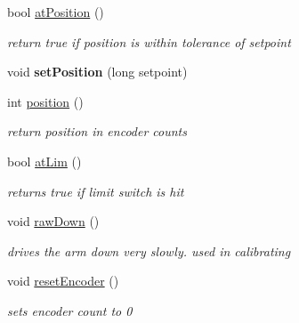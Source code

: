 \begin{DoxyCompactItemize}
\item 
\hypertarget{classArm_ae3c0195535b15f56f9027aea0ae5ec76}{bool \hyperlink{classArm_ae3c0195535b15f56f9027aea0ae5ec76}{at\-Position} ()}\label{classArm_ae3c0195535b15f56f9027aea0ae5ec76}

\begin{DoxyCompactList}\small\item\em return true if position is within tolerance of setpoint \end{DoxyCompactList}\item 
\hypertarget{classArm_a11049528120ab063b71e5614d0c6b12c}{void {\bfseries set\-Position} (long setpoint)}\label{classArm_a11049528120ab063b71e5614d0c6b12c}

\item 
\hypertarget{classArm_ab49756ee4bfdc5f573a78f29678bf1d8}{int \hyperlink{classArm_ab49756ee4bfdc5f573a78f29678bf1d8}{position} ()}\label{classArm_ab49756ee4bfdc5f573a78f29678bf1d8}

\begin{DoxyCompactList}\small\item\em return position in encoder counts \end{DoxyCompactList}\item 
\hypertarget{classArm_a234397ff44a8ac5fda920d92b9b33237}{bool \hyperlink{classArm_a234397ff44a8ac5fda920d92b9b33237}{at\-Lim} ()}\label{classArm_a234397ff44a8ac5fda920d92b9b33237}

\begin{DoxyCompactList}\small\item\em returns true if limit switch is hit \end{DoxyCompactList}\item 
\hypertarget{classArm_a90df7bcd3c225f6fc05ef2f77c773d2e}{void \hyperlink{classArm_a90df7bcd3c225f6fc05ef2f77c773d2e}{raw\-Down} ()}\label{classArm_a90df7bcd3c225f6fc05ef2f77c773d2e}

\begin{DoxyCompactList}\small\item\em drives the arm down very slowly. used in calibrating \end{DoxyCompactList}\item 
\hypertarget{classArm_afb44126b438f8dc00b0bf0720c84a737}{void \hyperlink{classArm_afb44126b438f8dc00b0bf0720c84a737}{reset\-Encoder} ()}\label{classArm_afb44126b438f8dc00b0bf0720c84a737}

\begin{DoxyCompactList}\small\item\em sets encoder count to 0 \end{DoxyCompactList}\end{DoxyCompactItemize}
